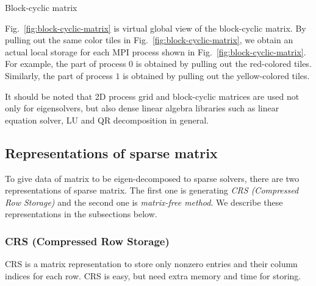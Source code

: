 \documentclass[12pt]{article}
\newcommand\figref[1]{Fig.~\ref{#1}}
\begin{document}
\begin{minipage}{\linewidth}
\begin{minipage}[c]{.5\linewidth}
\centering\drawblockcyclicglobal
{}\label{subfig:global-view}
\end{minipage}%
\begin{minipage}[c]{.5\linewidth}
\centering\drawblockcycliclocal
{}\label{subfig:local-view}
\end{minipage}
\caption{Block-cyclic matrix}\label{fig:block-cyclic-matrix}
\end{minipage}


\figref{fig:block-cyclic-matrix} is virtual global view of the block-cyclic matrix.
By pulling out the same color tiles in \figref{fig:block-cyclic-matrix},
we obtain an actual local storage for each MPI process shown in \figref{fig:block-cyclic-matrix}.
For example, the part of process $0$ is obtained by pulling out the red-colored tiles.
Similarly, the part of process $1$ is obtained by pulling out the yellow-colored tiles.

It should be noted that 2D process grid and block-cyclic matrices are used not only for eigensolvers, but also dense linear algebra libraries such as linear equation solver, LU and QR decomposition in general.

\subsection{Representations of sparse matrix}

To give data of matrix to be eigen-decomposed to sparse solvers, there are two representations of sparse matrix.
The first one is generating \emph{CRS (Compressed Row Storage)} and the second one is \emph{matrix-free method}.
We describe these representations in the subsections below.

\subsubsection{CRS (Compressed Row Storage)}

CRS is a matrix representation to store only nonzero entries and their column indices for each row.
CRS is easy, but need extra memory and time for storing.
\end{document}
